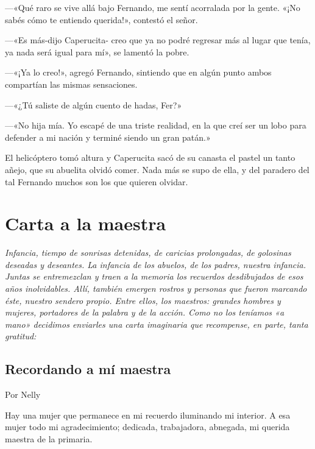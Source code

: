 \documentclass[11pt,twoside,openright,a5paper]{book}
\begin{document}
---«Qué raro se vive allá bajo Fernando, me sentí acorralada por la gente. «¡No sabés cómo  te entiendo querida!», contestó el señor.

---«Es más-dijo Caperucita- creo que ya no podré regresar más al lugar que tenía, ya nada será igual para mí», se lamentó la pobre.

---«¡Ya lo creo!», agregó Fernando, sintiendo que en algún punto ambos compartían las mismas sensaciones.

---«¿Tú saliste de algún cuento de hadas, Fer?»

---«No hija mía. Yo escapé de una triste realidad, en la que creí ser un lobo para defender a mi nación y terminé siendo un gran patán.»

El helicóptero tomó altura y Caperucita sacó de su canasta el pastel un tanto añejo, que su abuelita olvidó comer. Nada más se supo de ella, y del paradero del tal Fernando muchos son los que quieren olvidar.

\chapter*{Carta a la maestra}

\vspace{0.5cm}
\emph{Infancia, tiempo de sonrisas detenidas, de caricias prolongadas, de golosinas deseadas y deseantes. La infancia de los abuelos, de los padres, nuestra infancia. Juntas se entremezclan y traen a la memoria los recuerdos desdibujados de esos años inolvidables. Allí, también emergen rostros y personas que fueron marcando éste, nuestro sendero propio. Entre ellos, los maestros: grandes hombres y mujeres, portadores de la palabra y de la acción. Como no los teníamos «a mano» decidimos enviarles una carta imaginaria que recompense, en parte, tanta gratitud:}

\section*{Recordando a mí maestra}

                                                                                \begin{flushright}Por Nelly\end{flushright}

Hay una mujer que permanece en mi recuerdo iluminando mi interior. A esa mujer todo mi agradecimiento; dedicada, trabajadora, abnegada, mi querida maestra de la primaria.
\end{document}
